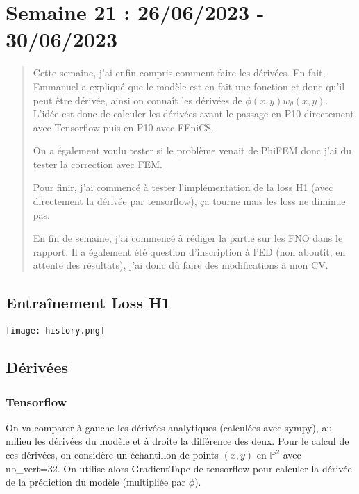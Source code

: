 \section{Semaine 21 : 26/06/2023 - 30/06/2023}
\graphicspath{{semaines/semaine_21/images/}}

\begin{abstract}
	Cette semaine, j'ai enfin compris comment faire les dérivées. En fait, Emmanuel a expliqué que le modèle est en fait une fonction et donc qu'il peut être dérivée, ainsi on connaît les dérivées de $\phi(x,y)w_\theta(x,y)$. 
	L'idée est donc de calculer les dérivées avant le passage en P10 directement avec Tensorflow puis en P10 avec FEniCS.
	
	On a également voulu tester si le problème venait de PhiFEM donc j'ai du tester la correction avec FEM.
	
	Pour finir, j'ai commencé à tester l'implémentation de la loss H1 (avec directement la dérivée par tensorflow), ça tourne mais les loss ne diminue pas.
	
	En fin de semaine, j'ai commencé à rédiger la partie sur les FNO dans le rapport. Il a également été question d'inscription à l'ED (non aboutit, en attente des résultats), j'ai donc dû faire des modifications à mon CV.
\end{abstract}

\subsection{Entraînement Loss H1}

\begin{minipage}{\linewidth}
	\centering
	\texttt{[image: history.png]}
\end{minipage}

\subsection{Dérivées}

\subsubsection*{Tensorflow}

On va comparer à gauche les dérivées analytiques (calculées avec sympy), au milieu les dérivées du modèle et à droite la différence des deux. Pour le calcul de ces dérivées, on considère un échantillon de points $(x,y)$ en $\mathbb{P}^2$ avec nb\_vert=32. On utilise alors GradientTape de tensorflow pour calculer la dérivée de la prédiction du modèle (multipliée par $\phi$).

